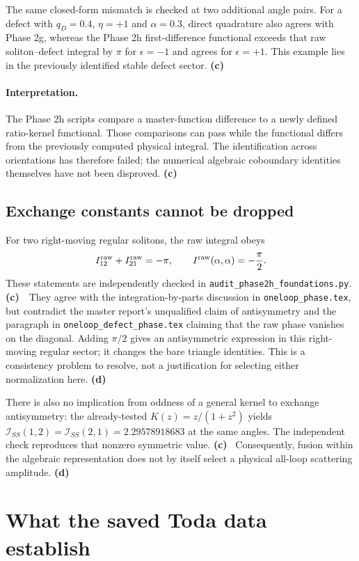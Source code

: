 \documentclass[11pt,a4paper]{article}
\newcommand{\Lc}{\textsf{\textbf{(c)}}\ }
\newcommand{\Ld}{\textsf{\textbf{(d)}}\ }
\newcommand{\scr}{\texttt{audit\_\allowbreak phase2h\_\allowbreak foundations.py}}
\begin{document}
The same closed-form mismatch is checked at two additional angle pairs.
For a defect with $q_D=0.4$, $\eta=+1$ and $\alpha=0.3$, direct quadrature
also agrees with Phase 2g, whereas the Phase 2h first-difference functional
exceeds that raw soliton--defect integral by $\pi$ for $\epsilon=-1$ and agrees
for $\epsilon=+1$. This example lies in the previously identified stable
defect sector. \Lc

\paragraph{Interpretation.}
The Phase 2h scripts compare a master-function difference to a newly defined
ratio-kernel functional. Those comparisons can pass while the functional
differs from the previously computed physical integral. The identification
across orientations has therefore failed; the numerical algebraic
coboundary identities themselves have not been disproved. \Lc

\subsection{Exchange constants cannot be dropped}
For two right-moving regular solitons, the raw integral obeys
\begin{equation}
 I^{\rm raw}_{12}+I^{\rm raw}_{21}=-\pi,\qquad
 I^{\rm raw}(\alpha,\alpha)=-\frac\pi2.
 \label{eq:raw}
\end{equation}
These statements are independently checked in \scr. \Lc\ They agree with
the integration-by-parts discussion in \texttt{oneloop\_phase.tex}, but
contradict the master report's unqualified claim of antisymmetry and the
paragraph in \texttt{oneloop\_defect\_phase.tex} claiming that the raw phase
vanishes on the diagonal. Adding $\pi/2$ gives an antisymmetric expression
in this right-moving regular sector; it changes the bare triangle identities.
This is a consistency problem to resolve, not a justification for selecting
either normalization here. \Ld

There is also no implication from oddness of a general kernel to exchange
antisymmetry: the already-tested $K(z)=z/(1+z^2)$ yields
$\mathcal I_{SS}(1,2)=\mathcal I_{SS}(2,1)=2.29578918683$ at the same angles.
The independent check reproduces that nonzero symmetric value. \Lc
Consequently, fusion within the algebraic representation does not by itself
select a physical all-loop scattering amplitude. \Ld

\section{What the saved Toda data establish}
\end{document}
